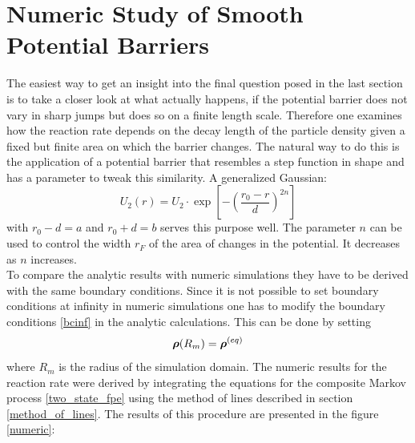 \newpage
\section{Numeric Study of Smooth Potential Barriers}
\label{Numeric_Study}
The easiest way to get an insight into the final question posed in the last section is to take a closer look at what actually happens, if the potential barrier does not vary in sharp jumps but does so on a finite length scale.
Therefore one examines how the reaction rate depends on the decay length of the particle density given a fixed but finite area on which the barrier changes. The natural way to do this is the application of a potential barrier that resembles a step function in shape and has a parameter to tweak this similarity. A generalized Gaussian:
\begin{equation}
    U_2(r) = U_2 \cdot \exp \left[ - \left( \frac{r_0 - r}{d} \right)^{2n} \right]
    \label{generalized_gaussian}
\end{equation}
with $r_0-d=a$ and $r_0+d=b$ serves this purpose well. The parameter $n$ can be used to control the width $r_F$ of the area of changes in the potential. It decreases as $n$ increases. \\
To compare the analytic results with numeric simulations they have to be derived with the same boundary conditions. Since it is not possible to set boundary conditions at infinity in numeric simulations one has to modify the boundary conditions \eqref{bcinf} in the analytic calculations. This can be done by setting 
\begin{equation}
    \boldsymbol{\mathbf{\rho}}(R_m) = \boldsymbol{\mathbf{\rho}}^{(eq)}
    \label{BC_for_numerics}
\end{equation}
where $R_m$ is the radius of the simulation domain. The numeric results for the reaction rate were derived by integrating the equations for the composite Markov process \eqref{two_state_fpe} using the method of lines described in section \ref{method_of_lines}. The results of this procedure are presented in the figure \ref{numeric}: \vspace{-0.5 cm}\\

